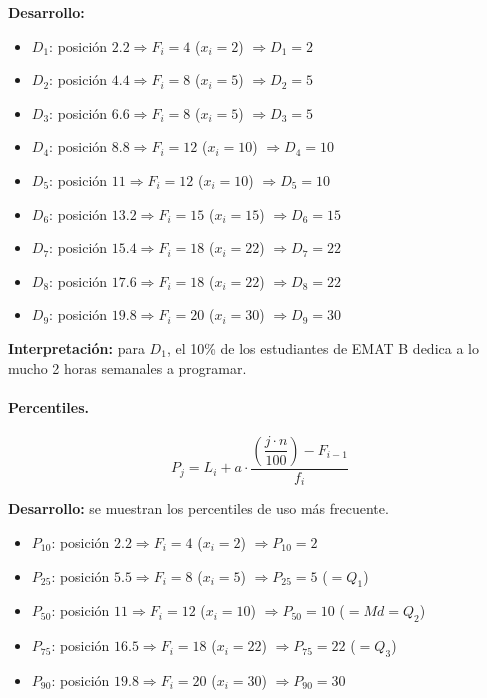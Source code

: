 \documentclass[12pt,letterpaper]{article}
\begin{document}
\noindent\textbf{Desarrollo:}
\begin{itemize}[nosep]
    \item $D_1$: posición $2.2 \Rightarrow F_i=4$ ($x_i=2$) $\Rightarrow D_1 = 2$
    \item $D_2$: posición $4.4 \Rightarrow F_i=8$ ($x_i=5$) $\Rightarrow D_2 = 5$
    \item $D_3$: posición $6.6 \Rightarrow F_i=8$ ($x_i=5$) $\Rightarrow D_3 = 5$
    \item $D_4$: posición $8.8 \Rightarrow F_i=12$ ($x_i=10$) $\Rightarrow D_4 = 10$
    \item $D_5$: posición $11 \Rightarrow F_i=12$ ($x_i=10$) $\Rightarrow D_5 = 10$
    \item $D_6$: posición $13.2 \Rightarrow F_i=15$ ($x_i=15$) $\Rightarrow D_6 = 15$
    \item $D_7$: posición $15.4 \Rightarrow F_i=18$ ($x_i=22$) $\Rightarrow D_7 = 22$
    \item $D_8$: posición $17.6 \Rightarrow F_i=18$ ($x_i=22$) $\Rightarrow D_8 = 22$
    \item $D_9$: posición $19.8 \Rightarrow F_i=20$ ($x_i=30$) $\Rightarrow D_9 = 30$
\end{itemize}

\noindent\textbf{Interpretación:} para $D_1$, el 10\% de los estudiantes de EMAT B dedica a lo mucho 2 horas semanales a programar.

\paragraph{Percentiles.}
$$P_j = L_i + a \cdot \frac{\left(\dfrac{j \cdot n}{100}\right) - F_{i-1}}{f_i}$$

\noindent\textbf{Desarrollo:} se muestran los percentiles de uso más frecuente.
\begin{itemize}[nosep]
    \item $P_{10}$: posición $2.2 \Rightarrow F_i=4$ ($x_i=2$) $\Rightarrow P_{10} = 2$
    \item $P_{25}$: posición $5.5 \Rightarrow F_i=8$ ($x_i=5$) $\Rightarrow P_{25} = 5$ \quad ($=Q_1$)
    \item $P_{50}$: posición $11 \Rightarrow F_i=12$ ($x_i=10$) $\Rightarrow P_{50} = 10$ \quad ($=Md=Q_2$)
    \item $P_{75}$: posición $16.5 \Rightarrow F_i=18$ ($x_i=22$) $\Rightarrow P_{75} = 22$ \quad ($=Q_3$)
    \item $P_{90}$: posición $19.8 \Rightarrow F_i=20$ ($x_i=30$) $\Rightarrow P_{90} = 30$
\end{itemize}
\end{document}
